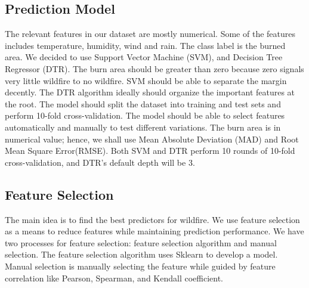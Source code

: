 \documentclass[conference]{IEEEtran}
\begin{document}
\subsection{Prediction Model}
The relevant features in our dataset are mostly numerical. Some of the features includes temperature, humidity, wind and rain. The class label is the burned area. We decided to use Support Vector Machine (SVM), and Decision Tree Regressor (DTR). The burn area should be greater than zero because zero signals very little wildfire to no wildfire. SVM should be able to separate the margin decently. The DTR algorithm ideally should organize the important features at the root. The model should split the dataset into training and test sets and perform 10-fold cross-validation. The model should be able to select features automatically and manually to test different variations. The burn area is in numerical value; hence, we shall use Mean Absolute Deviation (MAD) and Root Mean Square Error(RMSE). Both SVM and DTR perform 10 rounds of 10-fold cross-validation, and DTR's default depth will be 3.

\subsection{Feature Selection}
The main idea is to find the best predictors for wildfire. We use feature selection as a means to reduce features while maintaining prediction performance. We have two processes for feature selection: feature selection algorithm and manual selection. The feature selection algorithm uses Sklearn to develop a model. Manual selection is manually selecting the feature while guided by feature correlation like Pearson, Spearman, and Kendall coefficient.
\end{document}
